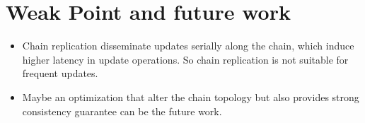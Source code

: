 \documentclass[conference]{IEEEtran}
\begin{document}
\section{Weak Point and future work}
\begin{itemize}
    \item Chain replication disseminate updates serially along the chain, which induce higher latency in update operations. So chain replication is not suitable for frequent updates.
    \item Maybe an optimization that alter the chain topology but also provides strong consistency guarantee can be the future work.
\end{itemize}
\end{document}
